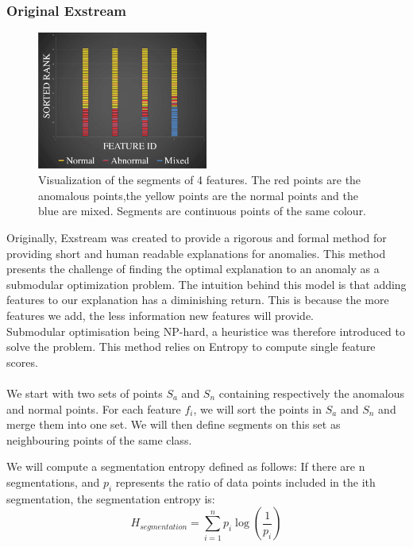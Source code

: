 \documentclass[oneside, a4paper, onecolumn, 11pt]{article}
\begin{document}
\subsubsection{Original Exstream}
\begin{figure}[h]
  \centering
  \includegraphics[width=0.5\textwidth]{images/exstreamplot.png}
  \caption{Visualization of the segments of 4 features. The red points are the anomalous points,the yellow points are the normal points and the blue are mixed. Segments are continuous points of the same colour.}
  \label{fig:exstreamplot}
\end{figure}
Originally, Exstream was created to provide a rigorous and formal method for providing short and human readable explanations for anomalies. This method presents the challenge of finding the optimal explanation to an anomaly as a submodular optimization problem. The intuition behind this model is that adding features to our explanation has a diminishing return. This is because the more features we add, the less information new features will provide.\\
Submodular optimisation being NP-hard, a heuristice was therefore introduced to solve the problem. This method relies on Entropy to compute single feature scores.\\\\
We start with two sets of points $S_a$ and $S_n$ containing respectively the anomalous and normal points.
For each feature $f_i$, we will sort the points in $S_a$ and $S_n$ and merge them into one set. We will then define segments on this set as neighbouring points of the same class.

We will compute a segmentation entropy defined as follows:
If there are n segmentations, and $p_i$ represents the ratio of data points included in the ith segmentation, the segmentation entropy is:
\begin{equation}
    H_{segmentation} = \sum_{i=1}^{n} p_i \log(\frac{1}{p_i})
\end{equation}
\end{document}
